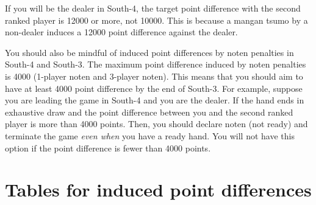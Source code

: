 \bigskip
If you will be the dealer in South-4, the target point difference with the second ranked player is 12000 or more, not 10000. This is because a {\jap mangan tsumo} by a non-dealer induces a 12000 point difference against the dealer.

\bigskip
You should also be mindful of induced point differences by {\jap noten} penalties in South-4 and South-3. The maximum point difference induced by {\jap noten} penalties is 4000 (1-player {\jap noten} and 3-player {\jap noten}). This means that you should aim to have at least 4000 point difference by the end of South-3.
For example, suppose you are leading the game in South-4 and you are the dealer. If the hand ends in exhaustive draw and the point difference between you and the second ranked player is more than 4000 points. Then, you should declare {\jap noten} (not ready) and terminate the game \emph{even when} you have a ready hand. You will not have this option if the point difference is fewer than 4000 points.

\newpage

\section{Tables for induced point differences}

